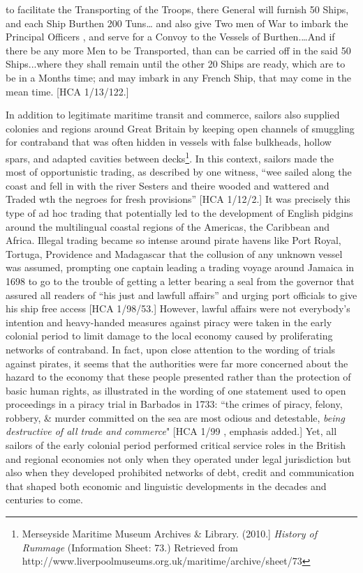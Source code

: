 to facilitate the Transporting of the Troops, there General will furnish 50 Ships, and each Ship Burthen 200 Tuns… and also give Two men of War to imbark the Principal Officers , and serve for a Convoy to the Vessels of Burthen.…And if there be any more Men to be Transported, than can be carried off in the said 50 Ships...where they shall remain until the other 20 Ships are ready, which are to be in a Months time; and may imbark in any French Ship, that may come in the mean time. [HCA 1/13/122.]

In addition to legitimate maritime transit and commerce, sailors also supplied colonies and regions around Great Britain by keeping open channels of smuggling for contraband that was often hidden in vessels with false bulkheads, hollow spars, and adapted cavities between decks\footnote{Merseyside Maritime Museum Archives \& Library. (2010.]  \textit{History of Rummage} (Information Sheet: 73.) Retrieved from http://www.liverpoolmuseums.org.uk/maritime/archive/sheet/73}. In this context, sailors made the most of opportunistic trading, as described by one witness, “wee sailed along the coast and fell in with the river Sesters and theire wooded and wattered and Traded wth the negroes for fresh provisions” [HCA 1/12/2.] It was precisely this type of ad hoc trading that potentially led to the development of English pidgins around the multilingual coastal regions of the Americas, the Caribbean and Africa. Illegal trading became so intense around pirate havens like Port Royal, Tortuga, Providence and Madagascar that the collusion of any unknown vessel was assumed, prompting one captain leading a trading voyage around Jamaica in 1698 to go to the trouble of getting a letter bearing a seal from the governor that assured all readers of “his just and lawfull affairs” and urging port officials to give his ship free access [HCA 1/98/53.] However, lawful affairs were not everybody’s intention and heavy-handed measures against piracy were taken in the early colonial period to limit damage to the local economy caused by proliferating networks of contraband. In fact, upon close attention to the wording of trials against pirates, it seems that the authorities were far more concerned about the hazard to the economy that these people presented rather than the protection of basic human rights, as illustrated in the wording of one statement used to open proceedings in a piracy trial in Barbados in 1733: “the crimes of piracy, felony, robbery, \& murder committed on the sea are most odious and detestable, \textit{being destructive of all trade and commerce}" [HCA 1/99 \citealt{Barbados1733}, emphasis added.] Yet, all sailors of the early colonial period performed critical service roles in the British and regional economies not only when they operated under legal jurisdiction but also when they developed prohibited networks of debt, credit and communication that shaped both economic and linguistic developments in the decades and centuries to come. 

